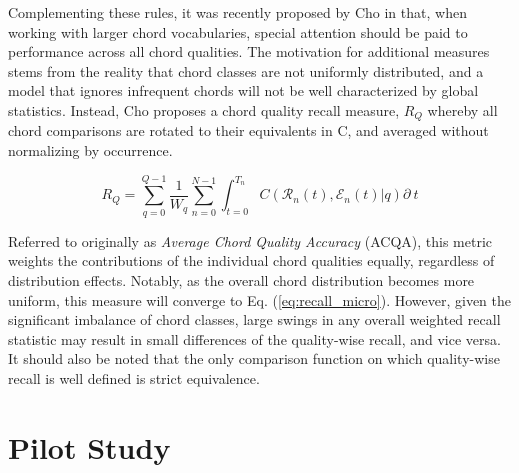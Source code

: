 Complementing these rules, it was recently proposed by Cho in \cite{Cho2014Improved} that, when working with larger chord vocabularies, special attention should be paid to performance across all chord qualities.
The motivation for additional measures stems from the reality that chord classes are not uniformly distributed, and a model that ignores infrequent chords will not be well characterized by global statistics.
Instead, Cho proposes a chord quality recall measure, $R_{Q}$ whereby all chord comparisons are rotated to their equivalents in C, and averaged without normalizing by occurrence.

\begin{equation}
R_{Q} = \sum_{q=0}^{Q-1}\frac{1}{W_q}\sum_{n=0}^{N-1}\int_{t=0}^{T_n}C(\mathcal{R}_n(t), \mathcal{E}_n(t) | q)\partial~t
\end{equation}

\noindent Referred to originally as \emph{Average Chord Quality Accuracy} (ACQA), this metric weights the contributions of the individual chord qualities equally, regardless of distribution effects.
Notably, as the overall chord distribution becomes more uniform, this measure will converge to Eq. (\ref{eq:recall_micro}).
However, given the significant imbalance of chord classes, large swings in any overall weighted recall statistic may result in small differences of the quality-wise recall, and vice versa.
It should also be noted that the only comparison function on which quality-wise recall is well defined is strict equivalence.


\section{Pilot Study}
\label{sec:pilot_study}

